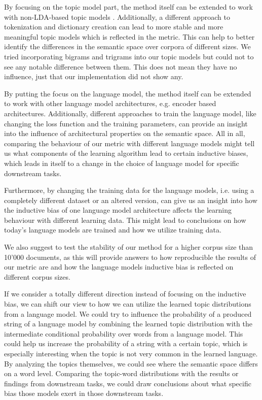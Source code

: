 By focusing on the topic model part, the method itself can be extended to work with non-LDA-based topic models \cite{karami2018fuzzy, zhang2022pre}. Additionally, a different approach to tokenization and dictionary creation can lead to more stable and more meaningful topic models which is reflected in the metric. This can help to better identify the differences in the semantic space over corpora of different sizes. We tried incorporating bigrams and trigrams into our topic models but could not to see any notable difference between them. This does not mean they have no influence, just that our implementation did not show any.

By putting the focus on the language model, the method itself can be extended to work with other language model architectures, e.g. encoder based architectures. Additionally, different approaches to train the language model, like changing the loss function and the training parameters, can provide an insight into the influence of architectural properties on the semantic space. All in all, comparing the behaviour of our metric with different language models might tell us what components of the learning algorithm lead to certain inductive biases, which leads in itself to a change in the choice of language model for specific downstream tasks.

Furthermore, by changing the training data for the language models, i.e. using a completely different dataset or an altered version, can give us an insight into how the inductive bias of one language model architecture affects the learning behaviour with different learning data. This might lead to conclusions on how today's language models are trained and how we utilize training data. 

We also suggest to test the stability of our method for a higher corpus size than 10'000 documents, as this will provide answers to how reproducible the results of our metric are and how the language models inductive bias is reflected on different corpus sizes.

If we consider a totally different direction instead of focusing on the inductive bias, we can shift our view to how we can utilize the learned topic distributions from a language model. We could try to influence the probability of a produced string of a language model by combining the learned topic distribution with the intermediate conditional probability over words from a language model. This could help us increase the probability of a string with a certain topic, which is especially interesting when the topic is not very common in the learned language. By analyzing the topics themselves, we could see where the semantic space differs on a word level. Comparing the topic-word distributions with the results or findings from downstream tasks, we could draw conclusions about what specific bias those models exert in those downstream tasks. 